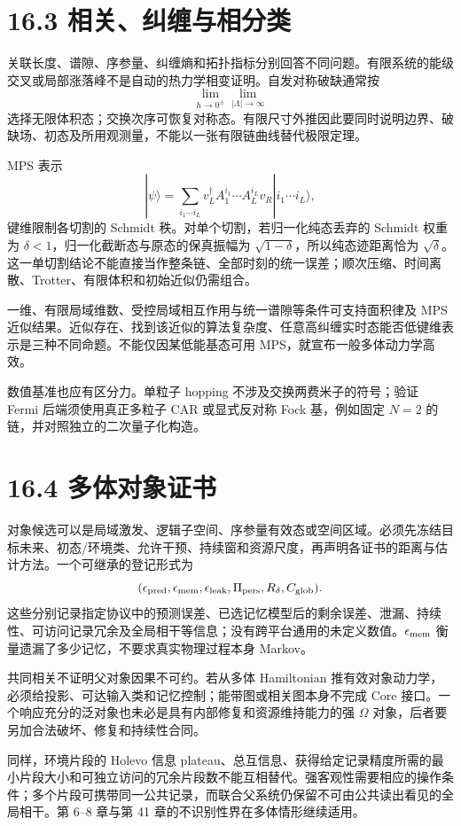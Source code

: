 \documentclass[
  11pt,
  oneside]{book}
\begin{document}
\section{16.3 相关、纠缠与相分类}

关联长度、谱隙、序参量、纠缠熵和拓扑指标分别回答不同问题。有限系统的能级交叉或局部涨落峰不是自动的热力学相变证明。自发对称破缺通常按
\[
\lim_{h\to0^\pm}\lim_{|\Lambda|\to\infty}
\]
选择无限体积态；交换次序可恢复对称态。有限尺寸外推因此要同时说明边界、破缺场、初态及所用观测量，不能以一张有限链曲线替代极限定理。

MPS 表示 \[
|\psi\rangle=\sum_{i_1\cdots i_L}
 v_L^\dagger A_1^{i_1}\cdots A_L^{i_L}v_R
 |i_1\cdots i_L\rangle,
\] 键维限制各切割的 Schmidt 秩。对单个切割，若归一化纯态丢弃的 Schmidt
权重为 \(\delta<1\)，归一化截断态与原态的保真振幅为
\(\sqrt{1-\delta}\)，所以纯态迹距离恰为
\(\sqrt\delta\)。这一单切割结论不能直接当作整条链、全部时刻的统一误差；顺次压缩、时间离散、Trotter、有限体积和初始近似仍需组合。

一维、有限局域维数、受控局域相互作用与统一谱隙等条件可支持面积律及 MPS
近似结果。近似存在、找到该近似的算法复杂度、任意高纠缠实时态能否低键维表示是三种不同命题。不能仅因某低能基态可用
MPS，就宣布一般多体动力学高效。

数值基准也应有区分力。单粒子 hopping 不涉及交换两费米子的符号；验证
Fermi 后端须使用真正多粒子 CAR 或显式反对称 Fock 基，例如固定 \(N=2\)
的链，并对照独立的二次量子化构造。

\section{16.4 多体对象证书}

对象候选可以是局域激发、逻辑子空间、序参量有效态或空间区域。必须先冻结目标未来、初态/环境类、允许干预、持续窗和资源尺度，再声明各证书的距离与估计方法。一个可继承的登记形式为
\[
(\epsilon_{\rm pred},\epsilon_{\rm mem},\epsilon_{\rm leak},
\Pi_{\rm pers},R_\delta,C_{\rm glob}).
\]
这些分别记录指定协议中的预测误差、已选记忆模型后的剩余误差、泄漏、持续性、可访问记录冗余及全局相干等信息；没有跨平台通用的未定义数值。\(\epsilon_{\rm mem}\)
衡量遗漏了多少记忆，不要求真实物理过程本身 Markov。

共同相关不证明父对象因果不可约。若从多体 Hamiltonian
推有效对象动力学，必须给投影、可达输入类和记忆控制；能带图或相关图本身不完成
Core 接口。一个响应充分的泛对象也未必是具有内部修复和资源维持能力的强
\(\Omega\) 对象，后者要另加合法破坏、修复和持续性合同。

同样，环境片段的 Holevo 信息
plateau、总互信息、获得给定记录精度所需的最小片段大小和可独立访问的冗余片段数不能互相替代。强客观性需要相应的操作条件；多个片段可携带同一公共记录，而联合父系统仍保留不可由公共读出看见的全局相干。第
6--8 章与第 41 章的不识别性界在多体情形继续适用。
\end{document}

